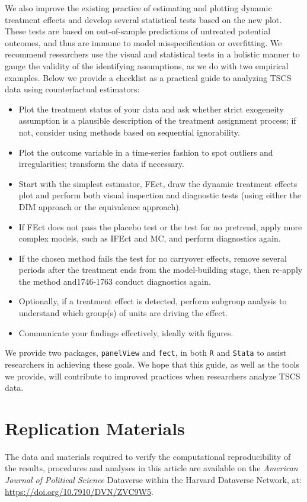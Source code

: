 \documentclass[12pt]{article}
\begin{document}
We also improve the existing practice of estimating and plotting dynamic treatment effects and develop several statistical tests based on the new plot. These tests are based on out-of-sample predictions of untreated potential outcomes, and thus are immune to model misspecification or overfitting. We recommend researchers use the visual and statistical tests in a holistic manner to gauge the validity of the identifying assumptions, as we do with two empirical examples. Below we provide a checklist as a practical guide to analyzing TSCS data using counterfactual estimators:
\begin{itemize}[leftmargin=*]\itemsep0em
  \item Plot the treatment status of your data and ask whether strict exogeneity assumption is a plausible description of the treatment assignment process; if not, consider using methods based on sequential ignorability.
  \item Plot the outcome variable in a time-series fashion to spot outliers and irregularities; transform the data if necessary. 
  \item Start with the simplest estimator, FEct, draw the dynamic treatment effects plot and perform both visual inspection and diagnostic tests (using either the DIM approach or the equivalence approach). 
  \item If FEct does not pass the placebo test or the test for no pretrend, apply more complex models, such as IFEct and MC, and perform diagnostics again. 
  \item If the chosen method fails the test for no carryover effects, remove several periods after the treatment ends from the model-building stage, then re-apply the method and1746-1763 conduct diagnostics again. 
  \item Optionally, if a treatment effect is detected, perform subgroup analysis to understand which group(s) of units are driving the effect.
  \item Communicate your findings effectively, ideally with figures.
\end{itemize}
We provide two packages, \texttt{panelView} and \texttt{fect}, in both \texttt{R} and \texttt{Stata} to assist researchers in achieving these goals. We hope that this guide, as well as the tools we provide, will contribute to improved practices when researchers analyze TSCS data.  

\section*{Replication Materials}

The data and materials required to verify the computational reproducibility of the results, procedures and analyses in this article are available on the {\it American Journal of Political Science} Dataverse within the Harvard Dataverse Network, at: \url{https://doi.org/10.7910/DVN/ZVC9W5}.

\vspace{2em}

\clearpage
\FloatBarrier
{}


\clearpage
\end{document}
